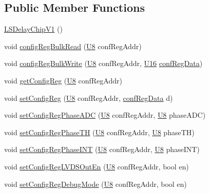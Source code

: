 \subsection*{Public Member Functions}
\begin{DoxyCompactItemize}
\item 
\hyperlink{classLSDelayChipV1_a4dbc01a273a6e044b6f163e12e136134}{LSDelayChipV1} ()
\item 
void \hyperlink{classLSDelayChipV1_a97a50092ce40f6322db946fc580f7230}{configRegBulkRead} (\hyperlink{LSDelayChipV1_8h_a3cb25ca6f51f003950f9625ff05536fc}{U8} confRegAddr)
\item 
void \hyperlink{classLSDelayChipV1_afa626b5d52f8723bcaa3205d1cc7a0f8}{configRegBulkWrite} (\hyperlink{LSDelayChipV1_8h_a3cb25ca6f51f003950f9625ff05536fc}{U8} confRegAddr, \hyperlink{LSDelayChipV1_8h_adf928e51a60dba0df29d615401cc55a8}{U16} \hyperlink{structconfRegData}{confRegData})
\item 
void \hyperlink{classLSDelayChipV1_a4f338071d49df7eae55020a5f5fa8474}{getConfigReg} (\hyperlink{LSDelayChipV1_8h_a3cb25ca6f51f003950f9625ff05536fc}{U8} confRegAddr)
\item 
void \hyperlink{classLSDelayChipV1_a11fa2ebfa37c5cf0544ddb68c7d43e94}{setConfigReg} (\hyperlink{LSDelayChipV1_8h_a3cb25ca6f51f003950f9625ff05536fc}{U8} confRegAddr, \hyperlink{structconfRegData}{confRegData} d)
\item 
void \hyperlink{classLSDelayChipV1_ad83fb046d3576cdccdb4b4fe59f7ff71}{setConfigRegPhaseADC} (\hyperlink{LSDelayChipV1_8h_a3cb25ca6f51f003950f9625ff05536fc}{U8} confRegAddr, \hyperlink{LSDelayChipV1_8h_a3cb25ca6f51f003950f9625ff05536fc}{U8} phaseADC)
\item 
void \hyperlink{classLSDelayChipV1_aa1364ef56bf75884756a8d589cee4328}{setConfigRegPhaseTH} (\hyperlink{LSDelayChipV1_8h_a3cb25ca6f51f003950f9625ff05536fc}{U8} confRegAddr, \hyperlink{LSDelayChipV1_8h_a3cb25ca6f51f003950f9625ff05536fc}{U8} phaseTH)
\item 
void \hyperlink{classLSDelayChipV1_a317f739744d1093385306530fe5b312a}{setConfigRegPhaseINT} (\hyperlink{LSDelayChipV1_8h_a3cb25ca6f51f003950f9625ff05536fc}{U8} confRegAddr, \hyperlink{LSDelayChipV1_8h_a3cb25ca6f51f003950f9625ff05536fc}{U8} phaseINT)
\item 
void \hyperlink{classLSDelayChipV1_a46a7aee8c7373c6858af9ecd29e9b116}{setConfigRegLVDSOutEn} (\hyperlink{LSDelayChipV1_8h_a3cb25ca6f51f003950f9625ff05536fc}{U8} confRegAddr, bool en)
\item 
void \hyperlink{classLSDelayChipV1_a813eca3585445d504d60a93ec55817f4}{setConfigRegDebugMode} (\hyperlink{LSDelayChipV1_8h_a3cb25ca6f51f003950f9625ff05536fc}{U8} confRegAddr, bool en)

\end{DoxyCompactItemize}
